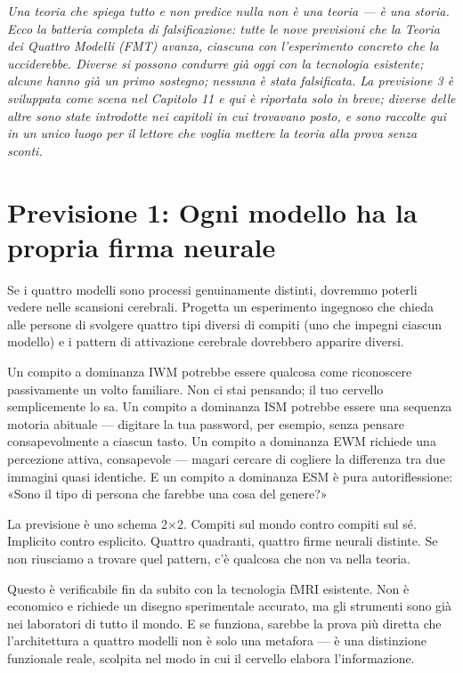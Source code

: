 \documentclass[11pt, twoside, openright]{book}
\begin{document}
\textit{Una teoria che spiega tutto e non predice nulla non è una teoria --- è una storia. Ecco la batteria completa di falsificazione: tutte le nove previsioni che la Teoria dei Quattro Modelli (FMT) avanza, ciascuna con l'esperimento concreto che la ucciderebbe. Diverse si possono condurre già oggi con la tecnologia esistente; alcune hanno già un primo sostegno; nessuna è stata falsificata. La previsione 3 è sviluppata come scena nel Capitolo 11 e qui è riportata solo in breve; diverse delle altre sono state introdotte nei capitoli in cui trovavano posto, e sono raccolte qui in un unico luogo per il lettore che voglia mettere la teoria alla prova senza sconti.}

\section*{Previsione 1: Ogni modello ha la propria firma neurale}

Se i quattro modelli sono processi genuinamente distinti, dovremmo poterli vedere nelle scansioni cerebrali. Progetta un esperimento ingegnoso che chieda alle persone di svolgere quattro tipi diversi di compiti (uno che impegni ciascun modello) e i pattern di attivazione cerebrale dovrebbero apparire diversi.

Un compito a dominanza IWM potrebbe essere qualcosa come riconoscere passivamente un volto familiare. Non ci stai pensando; il tuo cervello semplicemente lo sa. Un compito a dominanza ISM potrebbe essere una sequenza motoria abituale --- digitare la tua password, per esempio, senza pensare consapevolmente a ciascun tasto. Un compito a dominanza EWM richiede una percezione attiva, consapevole --- magari cercare di cogliere la differenza tra due immagini quasi identiche. E un compito a dominanza ESM è pura autoriflessione: «Sono il tipo di persona che farebbe una cosa del genere?»

La previsione è uno schema 2×2. Compiti sul mondo contro compiti sul sé. Implicito contro esplicito. Quattro quadranti, quattro firme neurali distinte. Se non riusciamo a trovare quel pattern, c'è qualcosa che non va nella teoria.

Questo è verificabile fin da subito con la tecnologia fMRI esistente. Non è economico e richiede un disegno sperimentale accurato, ma gli strumenti sono già nei laboratori di tutto il mondo. E se funziona, sarebbe la prova più diretta che l'architettura a quattro modelli non è solo una metafora --- è una distinzione funzionale reale, scolpita nel modo in cui il cervello elabora l'informazione.
\end{document}
